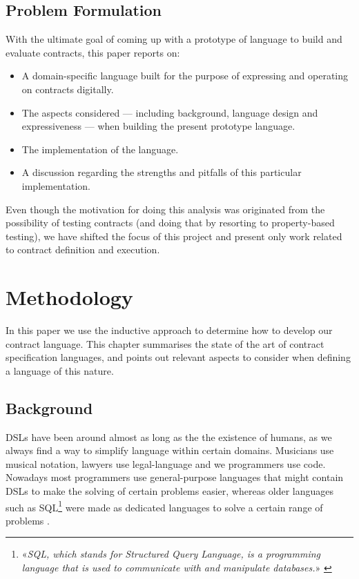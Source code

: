\documentclass{ituthesis}
\begin{document}
\section{Problem Formulation}
With the ultimate goal of coming up with a prototype of language to build and evaluate contracts, this paper reports on:
\begin{itemize}
    \item A domain-specific language built for the purpose of expressing and operating on contracts digitally.
    \item The aspects considered --- including background, language design and expressiveness ---  when building the present prototype language.
    \item The implementation of the language.
    \item A discussion regarding the strengths and pitfalls of this particular implementation.
\end{itemize}
Even though the motivation for doing this analysis was originated from the possibility of testing contracts (and doing that by resorting to property-based testing), we have shifted the focus of this project and present only work related to contract definition and execution.

\chapter{Methodology}
In this paper we use the inductive approach to determine how to develop our contract language. This chapter summarises the state of the art of contract specification languages, and points out relevant aspects to consider when defining a language of this nature.

\section{Background}
DSLs have been around almost as long as the the existence of humans, as we always find a way to simplify language within certain domains. Musicians use musical notation, lawyers use legal-language and we programmers use code. Nowadays most programmers use general-purpose languages that might contain DSLs to make the solving of certain problems easier, whereas older languages such as SQL\footnote{«\textit{SQL, which stands for Structured Query Language, is a programming language that is used to communicate with and manipulate databases.}» \cite{whatisSQL}} were made as dedicated languages to solve a certain range of problems \cite{van2000domain}.
\end{document}
